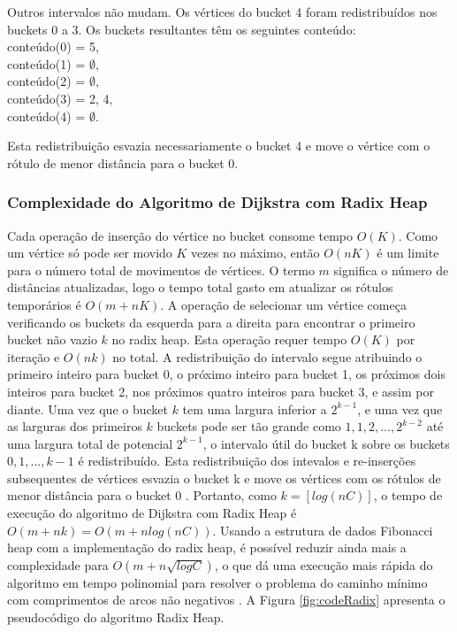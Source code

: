 Outros intervalos não mudam. Os vértices do bucket 4 foram redistribuídos nos buckets 0 a 3.
Os buckets resultantes têm os seguintes conteúdo:\\
conteúdo(0) = {5},\\
conteúdo(1) = $\emptyset$,\\
conteúdo(2) = $\emptyset$,\\
conteúdo(3) = {2, 4},\\
conteúdo(4) = $\emptyset$.

Esta redistribuição esvazia necessariamente o bucket 4 e move o vértice com o rótulo de menor distância para o bucket 0.

\subsubsection{Complexidade do Algoritmo de Dijkstra com Radix Heap}
Cada operação de inserção do vértice no bucket consome tempo $O(K)$.
Como um vértice só pode ser movido $K$ vezes no máximo, então $O(nK)$ é um limite para o número total de movimentos
de vértices.
O termo $m$ significa o número de distâncias atualizadas, logo o tempo total gasto em atualizar os rótulos temporários
é $O(m + nK)$.
A operação de selecionar um vértice começa verificando os buckets da esquerda para a direita para encontrar
o primeiro bucket não vazio $k$ no radix heap. Esta operação requer tempo $O(K)$ por iteração e $O(nk)$ no total.
A redistribuição do intervalo segue atribuindo o primeiro inteiro para bucket 0, o próximo inteiro para bucket 1,
os próximos dois inteiros para bucket 2, nos próximos quatro inteiros para bucket 3, e assim por diante.
Uma vez que o bucket $k$ tem uma largura inferior a $2^{k - 1}$, e uma vez que as larguras dos primeiros $k$ buckets
pode ser tão grande como $1, 1, 2, ..., 2^{k - 2}$ até uma largura total de potencial $2^{k - 1}$,
o intervalo útil do bucket k sobre os buckets $0, 1, ..., k - 1$ é redistribuído.
Esta redistribuição dos intevalos e re-inserções subsequentes de vértices esvazia o bucket k e move os vértices com
os rótulos de menor distância para o bucket 0 \cite{bookahuja}.
Portanto, como $k = [log(nC)]$, o tempo de execução do algoritmo de Dijkstra com Radix Heap é $O(m + nk) = O(m + n log(nC))$.
Usando a estrutura de dados Fibonacci heap com a implementação do radix heap, é possível reduzir ainda mais a complexidade
para $O(m + n\sqrt{logC})$, o que dá uma execução mais rápida do algoritmo em tempo polinomial para resolver
o problema do caminho mínimo com comprimentos de arcos não negativos \cite{ahuja}.
A Figura \ref{fig:codeRadix} apresenta o pseudocódigo do algoritmo Radix Heap.

